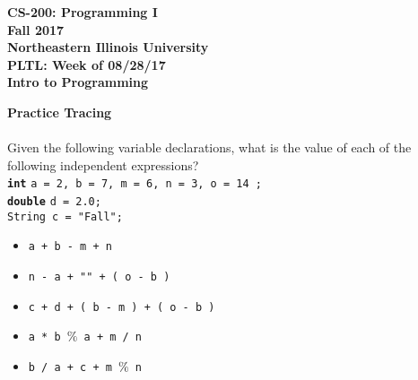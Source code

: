 \documentclass[12pt]{article}
\begin{document}
\begin{center}
	\textbf{CS-200: Programming I}\\
	\textbf{Fall 2017}\\
	\textbf{Northeastern Illinois University}\\
	\textbf{PLTL: Week of 08/28/17}\\
	\textbf{Intro to Programming}\\
\end{center}

\noindent\textbf{Practice Tracing}\\ \\
Given the following variable declarations, what is the value of each of the following independent expressions?\\
\hspace*{0.5cm}\textbf{\texttt{int}} \texttt{a = 2, b = 7, m = 6, n = 3, o = 14 ;}\\
\hspace*{0.5cm}\textbf{\texttt{double}} \texttt{d = 2.0;}\\
\hspace*{0.5cm}\texttt{String c = "Fall";}\\
\begin{itemize}

	\item \texttt{a + b - m + n}
	\item \texttt{n - a + "" + ( o - b )}
	\item \texttt{c + d + ( b - m ) + ( o - b )}
	\item \texttt{a * b $\%$ a + m / n}
	\item \texttt{b / a + c + m  $\%$ n}
	
\end{itemize}
\end{document}
